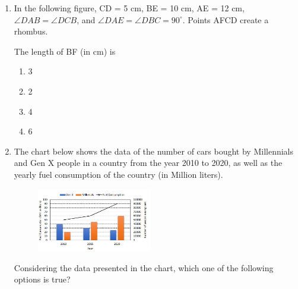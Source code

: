 \documentclass[journal]{IEEEtran}
\numberwithin{equation}{enumi}
\numberwithin{figure}{enumi}
\begin{document}
\begin{enumerate}
    \item In the following figure, 
    CD = 5 cm, BE = 10 cm, AE = 12 cm, 
    $\angle DAB = \angle DCB$, and $\angle DAE = \angle DBC = 90^\circ$.
    Points AFCD create a rhombus.
    \begin{figure}[!ht]
\centering
{}%

\label{fig:my_label}
\end{figure}
    The length of BF (in cm) is
    \begin{enumerate}
        \item  3
        \item  2
        \item  4
        \item  6
    \end{enumerate}
    \item The chart below shows the data of the number of cars bought by Millennials and Gen X people in a country from the year 2010 to 2020, as well as the yearly fuel consumption of the country (in Million liters).
     \begin{figure}[!ht]
    \centering
    \includegraphics[width=5cm]{figs/fig1.png}
    \end{figure}
    Considering the data presented in the chart, which one of the following options is true?
    

\end{enumerate}
\end{document}
